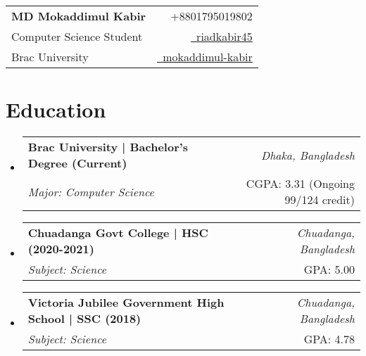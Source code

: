 \documentclass[a4paper,11pt]{article}
\makeatletter
\newcommand{\resumeSubheading}[4]{
\vspace{0.5mm}\item
    \begin{tabular*}{0.98\textwidth}[t]{l@{\extracolsep{\fill}}r}
        \textbf{#1} & \textit{\footnotesize{#4}} \\
        \textit{\footnotesize{#3}} &  \footnotesize{#2}\\
    \end{tabular*}
    \vspace{-2.4mm}
}
\newcommand{\resumeSubHeadingListStart}{\begin{itemize}[leftmargin=*,labelsep=0mm,label={}]}
\newcommand{\resumeSubHeadingListEnd}{\end{itemize}\vspace{2mm}}
\newcommand{\name}{MD Mokaddimul Kabir} %
\newcommand{\phone}{+8801795019802} %
\makeatother
\begin{document}
\selectfont

{
\begin{tabularx}{\linewidth}{L r} \\
  	\textbf{\Large \name} & {\raisebox{0.0\height}{\footnotesize \faPhone}\ \phone}\\
  Computer Science Student & \href{https://github.com/riadkabir45}{\raisebox{0.0\height}{\footnotesize \faGithub}\ {riadkabir45}} \\  
  {Brac University} & \href{https://linkedin.com/in/mokaddimul-kabir}{\raisebox{0.0\height}{\footnotesize \faLinkedin}\ {mokaddimul-kabir}}
\end{tabularx}
}


\section{\textbf{Education}}
  \resumeSubHeadingListStart
    \resumeSubheading
      {Brac University | Bachelor's Degree (Current)}{CGPA: 3.31 (Ongoing 99/124 credit)}
      {Major: Computer Science}{Dhaka, Bangladesh}
    \resumeSubheading
      {Chuadanga Govt College | HSC (2020-2021)}{GPA: 5.00}
      {Subject: Science}{Chuadanga, Bangladesh}
    \resumeSubheading
      {Victoria Jubilee Government High School | SSC (2018)}{GPA: 4.78}
      {Subject: Science}{Chuadanga, Bangladesh}
  \resumeSubHeadingListEnd
  \vspace{-5.5mm}
\end{document}
